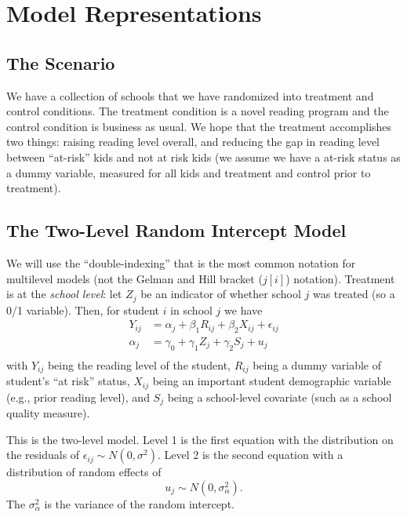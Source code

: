 \documentclass[
  letterpaper,
  DIV=11,
  numbers=noendperiod]{scrreprt}
\begin{document}
\hypertarget{model-representations}{%
\chapter{Model Representations}\label{model-representations}}

\hypertarget{the-scenario}{%
\section{The Scenario}\label{the-scenario}}

We have a collection of schools that we have randomized into treatment
and control conditions. The treatment condition is a novel reading
program and the control condition is business as usual. We hope that the
treatment accomplishes two things: raising reading level overall, and
reducing the gap in reading level between ``at-risk'' kids and not at
risk kids (we assume we have a at-risk status as a dummy variable,
measured for all kids and treatment and control prior to treatment).

\hypertarget{the-two-level-random-intercept-model}{%
\section{The Two-Level Random Intercept
Model}\label{the-two-level-random-intercept-model}}

We will use the ``double-indexing'' that is the most common notation for
multilevel models (not the Gelman and Hill bracket (\(j[i]\)) notation).
Treatment is at the \emph{school level}: let \(Z_j\) be an indicator of
whether school \(j\) was treated (so a 0/1 variable). Then, for student
\(i\) in school \(j\) we have \[\begin{aligned}
Y_{ij} &= \alpha_{j} + \beta_{1} R_{ij} + \beta_{2} X_{ij} + \epsilon_{ij} \\
\alpha_{j} &= \gamma_{0} + \gamma_{1} Z_{j} + \gamma_{2} S_{j} + u_{j} \\
\end{aligned}\] with \(Y_{ij}\) being the reading level of the student,
\(R_{ij}\) being a dummy variable of student's ``at risk'' status,
\(X_{ij}\) being an important student demographic variable (e.g., prior
reading level), and \(S_j\) being a school-level covariate (such as a
school quality measure).

This is the two-level model. Level 1 is the first equation with the
distribution on the residuals of
\(\epsilon_{ij} \sim N( 0, \sigma^2 )\). Level 2 is the second equation
with a distribution of random effects of
\[u_{j} \sim N( 0, \sigma^2_\alpha ) .\] The \(\sigma^2_\alpha\) is the
variance of the random intercept.
\end{document}
